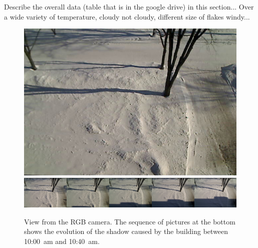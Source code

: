 Describe the overall data (table that is in the google drive) in this section... Over a wide variety of temperature, cloudy not cloudy, different size of flakes windy...
\begin{figure}[h]
    \centering
    \includegraphics[width=0.90\linewidth]{./img/camera_view.jpg}
    \includegraphics[width=0.95\linewidth]{./img/shadow2.png}
    \caption{View from the RGB camera. The sequence of pictures at the bottom shows the evolution of the shadow caused by the building between 10:00~am and 10:40~am.}
    \label{fig:setup}
\end{figure}
